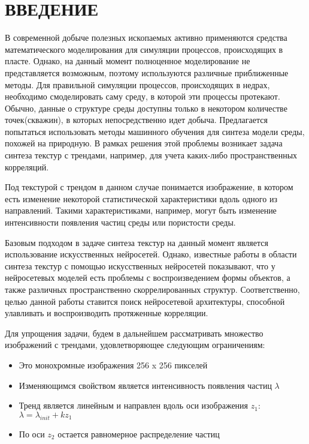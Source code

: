 \clearpage
\section*{\hfil ВВЕДЕНИЕ \hfil}
	В современной добыче полезных ископаемых активно применяются средства математического моделирования для симуляции процессов, происходящих в пласте. Однако, на данный момент полноценное моделирование не представляется возможным, поэтому используются различные приближенные методы. Для правильной симуляции процессов, происходящих в недрах, необходимо смоделировать саму среду, в которой эти процессы протекают. Обычно, данные о структуре среды доступны только в некотором количестве точек(скважин), в которых непосредственно идет добыча. Предлагается попытаться использовать методы машинного обучения для синтеза модели среды, похожей на природную. В рамках решения этой проблемы возникает задача синтеза текстур с трендами, например, для учета каких-либо пространственных корреляций. 
	
	Под текстурой с трендом в данном случае понимается изображение, в котором есть изменение некоторой статистической характеристики вдоль одного из направлений. Такими характеристиками, например, могут быть изменение интенсивности появления частиц среды или пористости среды.
	
	Базовым подходом в задаче синтеза текстур на данный момент является использование искусственных нейросетей. Однако, известные работы в области синтеза текстур с помощью искусственных нейросетей \cite{texture-synthesis-using-CNN, texture-networks} показывают, что у нейросетевых моделей есть проблемы с воспроизведением формы объектов, а также различных пространственно скоррелированных структур. Соответственно, целью данной работы ставится поиск нейросетевой архитектуры, способной улавливать и воспроизводить протяженные корреляции.
	
	Для упрощения задачи, будем в дальнейшем рассматривать множество изображений с трендами, удовлетворяющее следующим ограничениям:
	
	\begin{itemize}
		\item Это монохромные изображения 256 x 256 пикселей
		\item Изменяющимся свойством является интенсивность появления частиц $\lambda$
		\item Тренд является линейным и направлен вдоль оси изображения $z_1$: 
		$ \lambda = \lambda_{init} + k z_1 $
		\item По оси $z_2$ остается равномерное распределение частиц
	\end{itemize}
	
